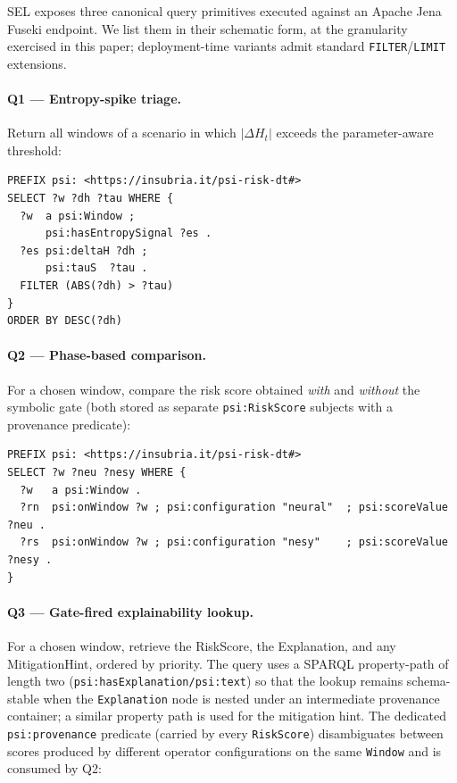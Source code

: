 \documentclass[futureinternet,article,submit,pdftex,moreauthors]{Definitions/mdpi}
\newcommand{\EntropyDeviation}{\ensuremath{\Delta H}}
\begin{document}
SEL exposes three canonical query primitives executed against an Apache
Jena Fuseki endpoint. We list them in their schematic form, at the
granularity exercised in this paper; deployment-time variants admit
standard \texttt{FILTER}/\texttt{LIMIT} extensions.

\paragraph{Q1 --- Entropy-spike triage.} Return all windows of a
scenario in which $|\EntropyDeviation_t|$ exceeds the parameter-aware threshold:

\begin{lstlisting}[language=SPARQL]
PREFIX psi: <https://insubria.it/psi-risk-dt#>
SELECT ?w ?dh ?tau WHERE {
  ?w  a psi:Window ;
      psi:hasEntropySignal ?es .
  ?es psi:deltaH ?dh ;
      psi:tauS  ?tau .
  FILTER (ABS(?dh) > ?tau)
}
ORDER BY DESC(?dh)
\end{lstlisting}

\paragraph{Q2 --- Phase-based comparison.} For a chosen window, compare
the risk score obtained \emph{with} and \emph{without} the symbolic gate
(both stored as separate \texttt{psi:RiskScore} subjects with a
provenance predicate):

\begin{lstlisting}[language=SPARQL]
PREFIX psi: <https://insubria.it/psi-risk-dt#>
SELECT ?w ?neu ?nesy WHERE {
  ?w   a psi:Window .
  ?rn  psi:onWindow ?w ; psi:configuration "neural"  ; psi:scoreValue ?neu .
  ?rs  psi:onWindow ?w ; psi:configuration "nesy"    ; psi:scoreValue ?nesy .
}
\end{lstlisting}

\paragraph{Q3 --- Gate-fired explainability lookup.} For a chosen
window, retrieve the RiskScore, the Explanation, and any
MitigationHint, ordered by priority. The query uses a SPARQL
property-path of length two (\texttt{psi:hasExplanation/psi:text}) so
that the lookup remains schema-stable when the \texttt{Explanation} node
is nested under an intermediate provenance container; a similar property
path is used for the mitigation hint. The dedicated
\texttt{psi:provenance} predicate (carried by every \texttt{RiskScore})
disambiguates between scores produced by different operator
configurations on the same \texttt{Window} and is consumed by Q2:
\end{document}
